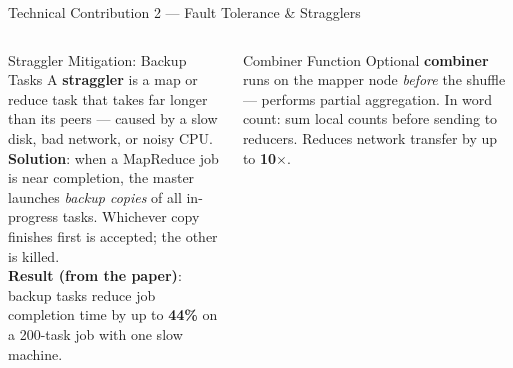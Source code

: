 \documentclass[aspectratio=169,10pt]{beamer}
\begin{document}
\begin{frame}{Technical Contribution 2 — Fault Tolerance \& Stragglers}
\begin{columns}[T]
      \begin{block}{Straggler Mitigation: Backup Tasks}
        A \textbf{straggler} is a map or reduce task that takes far
        longer than its peers — caused by a slow disk, bad network,
        or noisy CPU.\\[5pt]
        \textbf{Solution}: when a MapReduce job is near completion,
        the master launches \emph{backup copies} of all in-progress tasks.
        Whichever copy finishes first is accepted; the other is killed.\\[5pt]
        \textbf{Result (from the paper)}: backup tasks reduce job
        completion time by up to \textbf{44\%} on a 200-task job with
        one slow machine.
      \end{block}
      \vspace{4pt}
      \begin{alertblock}{Combiner Function}
        Optional \textbf{combiner} runs on the mapper node
        \emph{before} the shuffle — performs partial aggregation.
        In word count: sum local counts before sending to reducers.
        Reduces network transfer by up to \textbf{10$\times$}.
      \end{alertblock}
  \end{columns}
\end{frame}
\end{document}
